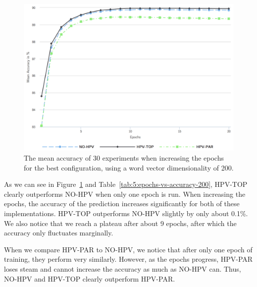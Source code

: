 \begin{figure}
	\centering
	\includegraphics[width=1.0\textwidth]{5experiments/epochs-vs-accuracy-200.png}
	\caption{The mean accuracy of 30 experiments when increasing the epochs for the best configuration, using a word vector dimensionality of 200.}
	\label{fig:5:epochs-vs-accuracy-200}
\end{figure}

As we can see in Figure~\ref{fig:5:epochs-vs-accuracy-200} and Table~\ref{tab:5:epochs-vs-accuracy-200}, HPV-TOP clearly outperforms NO-HPV when only one epoch is run. When increasing the epochs, the accuracy of the prediction increases significantly for both of these implementations. HPV-TOP outperforms NO-HPV slightly by only about 0.1\%. We also notice that we reach a plateau after about 9 epochs, after which the accuracy only fluctuates marginally.

When we compare HPV-PAR to NO-HPV, we notice that after only one epoch of training, they perform very similarly. However, as the epochs progress, HPV-PAR loses steam and cannot increase the accuracy as much as NO-HPV can. Thus, NO-HPV and HPV-TOP clearly outperform HPV-PAR\@.

